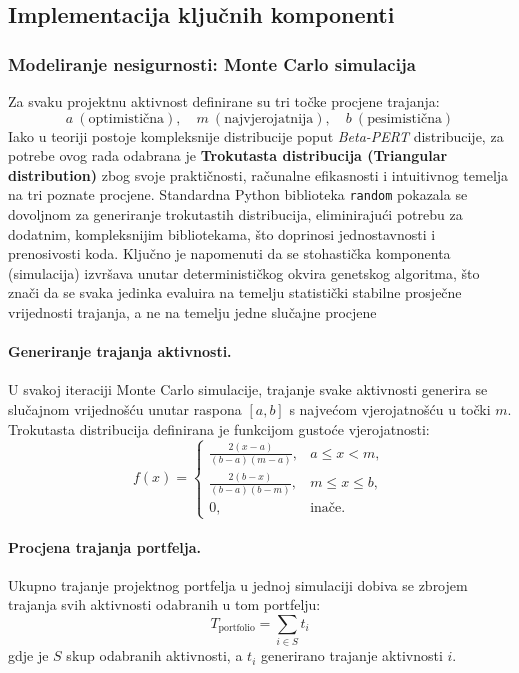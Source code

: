 \subsection{Implementacija ključnih komponenti}
\subsubsection{Modeliranje nesigurnosti: Monte Carlo simulacija}

Za svaku projektnu aktivnost definirane su tri točke procjene trajanja:
\[
a \ (\text{optimistična}), \quad
m \ (\text{najvjerojatnija}), \quad
b \ (\text{pesimistična})
\]
Iako u teoriji postoje kompleksnije distribucije poput \textit{Beta-PERT} distribucije, 
za potrebe ovog rada odabrana je \textbf{Trokutasta distribucija (Triangular distribution)} 
zbog svoje praktičnosti, računalne efikasnosti i intuitivnog temelja na tri poznate procjene.
Standardna Python biblioteka \texttt{random} pokazala se dovoljnom za generiranje trokutastih distribucija, eliminirajući potrebu za dodatnim, kompleksnijim bibliotekama, što doprinosi jednostavnosti i prenosivosti koda. Ključno je napomenuti da se stohastička komponenta (simulacija) izvršava unutar determinističkog okvira genetskog algoritma, što znači da se svaka jedinka evaluira na temelju statistički stabilne prosječne vrijednosti trajanja, a ne na temelju jedne slučajne procjene
\paragraph{Generiranje trajanja aktivnosti.}
U svakoj iteraciji Monte Carlo simulacije, trajanje svake aktivnosti generira se slučajnom vrijednošću 
unutar raspona $[a, b]$ s najvećom vjerojatnošću u točki $m$.  
Trokutasta distribucija definirana je funkcijom gustoće vjerojatnosti:
\[
f(x) =
\begin{cases}
\frac{2(x-a)}{(b-a)(m-a)}, & a \leq x < m, \\
\frac{2(b-x)}{(b-a)(b-m)}, & m \leq x \leq b, \\
0, & \text{inače}.
\end{cases}
\]

\paragraph{Procjena trajanja portfelja.}
Ukupno trajanje projektnog portfelja u jednoj simulaciji dobiva se zbrojem trajanja svih aktivnosti odabranih u tom portfelju:
\[
T_{\text{portfolio}} = \sum_{i \in S} t_i
\]
gdje je $S$ skup odabranih aktivnosti, a $t_i$ generirano trajanje aktivnosti $i$.

